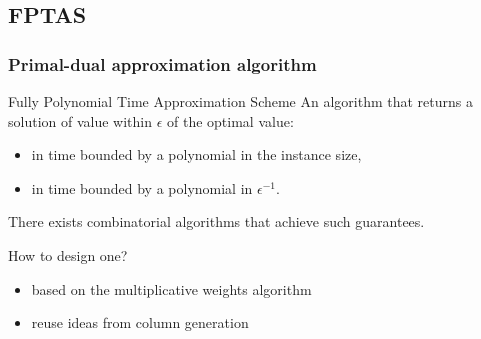 \documentclass{beamer}
\begin{document}
\subsection{FPTAS}
\begin{frame}
    \frametitle{Primal-dual approximation algorithm}

    \begin{block}{Fully Polynomial Time Approximation Scheme}
        An algorithm that returns a solution of value within $\epsilon$ of the
        optimal value:
        \begin{itemize}
            \item in time bounded by a polynomial in the instance size,
            \item in time bounded by a polynomial in $\epsilon^{-1}$.
        \end{itemize}
    \end{block}

    There exists combinatorial algorithms that achieve such guarantees.

    \begin{block}{How to design one?}
        \begin{itemize}
            \item based on the multiplicative weights algorithm
            \item reuse ideas from column generation
        \end{itemize}
    \end{block}

\end{frame}
\end{document}
